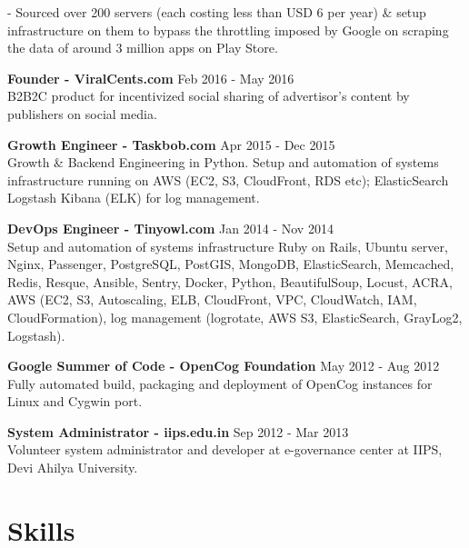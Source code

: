 \documentclass[overlapped,centered]{resume}
\begin{document}
\begin{resume}
\begin{list2}
		- Sourced over 200 servers (each costing less than USD 6 per year) \& setup infrastructure on them to bypass the throttling imposed by Google on scraping the data of around 3 million apps on Play Store.

	\setlength{\leftskip}{0pt}

    \item \textbf{Founder - ViralCents.com} \hspace{82mm} Feb 2016 - May 2016 \\ B2B2C product for incentivized social sharing of advertisor's content by publishers on social media.
    
    \item \textbf{Growth Engineer - Taskbob.com} \hspace{54mm} Apr 2015 - Dec 2015 \\ Growth \& Backend Engineering in Python. Setup and automation of systems infrastructure running on AWS (EC2, S3, CloudFront, RDS etc); ElasticSearch Logstash Kibana (ELK) for log management.
    
    \item \textbf{DevOps Engineer - Tinyowl.com} \hspace{70mm} Jan 2014 - Nov 2014 \\ Setup and automation of systems infrastructure Ruby on Rails, Ubuntu server, Nginx, Passenger, PostgreSQL, PostGIS, MongoDB, ElasticSearch, Memcached, Redis, Resque, Ansible, Sentry, Docker, Python, BeautifulSoup, Locust, ACRA, AWS (EC2, S3, Autoscaling, ELB, CloudFront, VPC, CloudWatch, IAM, CloudFormation), log management (logrotate, AWS S3, ElasticSearch, GrayLog2, Logstash).
    
	\item \textbf{Google Summer of Code - OpenCog Foundation} \hspace{40mm} May 2012 - Aug 2012 \\ Fully automated build, packaging and deployment of OpenCog instances for Linux and Cygwin port.

	\item \textbf{System Administrator - iips.edu.in} \hspace{60mm} Sep 2012 - Mar 2013 \\ Volunteer system administrator and developer at e-governance center at IIPS, Devi Ahilya University.

	\end{list2}

    \section{\mysidestyle Skills} 


\end{resume}
\end{document}
